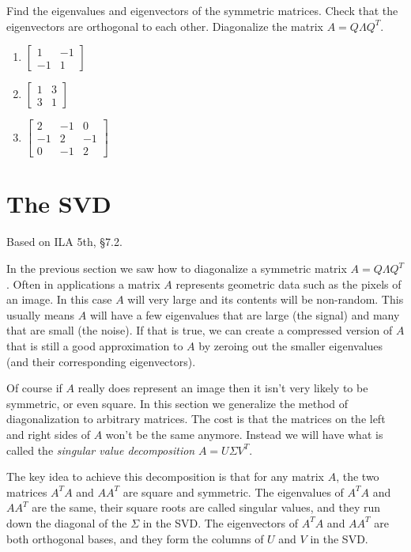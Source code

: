 \documentclass[11pt,oneside]{amsbook}
\theoremstyle{definition}
\theoremstyle{plain}
\theoremstyle{definition}
\theoremstyle{remark}
\numberwithin{equation}{section}
\numberwithin{figure}{section}
\newcounter{activityitem}
\newenvironment{activity}{\begin{list}{\arabic{activityitem}.}{\usecounter{activityitem}\setlength{\itemsep}{.2in}}}{\end{list}}
\begin{document}
\begin{activity}
  \item Find the eigenvalues and eigenvectors of the symmetric matrices. Check that the eigenvectors are orthogonal to each other. Diagonalize the matrix $A=Q\Lambda Q^T$.
  \begin{enumerate}
    \item $\begin{bmatrix}1&-1\\-1&1\end{bmatrix}$
    \item $\begin{bmatrix}1&3\\3&1\end{bmatrix}$
    \item $\begin{bmatrix}2&-1&0\\-1&2&-1\\0&-1&2\end{bmatrix}$
  \end{enumerate}
\end{activity}


\newpage
\section{The SVD}

Based on ILA 5th, \S 7.2.

In the previous section we saw how to diagonalize a symmetric matrix $A=Q\Lambda Q^T$. Often in applications a matrix $A$ represents geometric data such as the pixels of an image. In this case $A$ will very large and its contents will be non-random. This usually means $A$ will have a few eigenvalues that are large (the signal) and many that are small (the noise). If that is true, we can create a compressed version of $A$ that is still a good approximation to $A$ by zeroing out the smaller eigenvalues (and their corresponding eigenvectors).

Of course if $A$ really does represent an image then it isn't very likely to be symmetric, or even square. In this section we generalize the method of diagonalization to arbitrary matrices. The cost is that the matrices on the left and right sides of $A$ won't be the same anymore. Instead we will have what is called the \emph{singular value decomposition} $A=U\Sigma V^T$.

The key idea to achieve this decomposition is that for any matrix $A$, the two matrices $A^TA$ and $AA^T$ are square and symmetric. The eigenvalues of $A^TA$ and $AA^T$ are the same, their square roots are called singular values, and they run down the diagonal of the $\Sigma$ in the SVD. The eigenvectors of $A^TA$ and $AA^T$ are both orthogonal bases, and they form the columns of $U$ and $V$ in the SVD.
\end{document}
